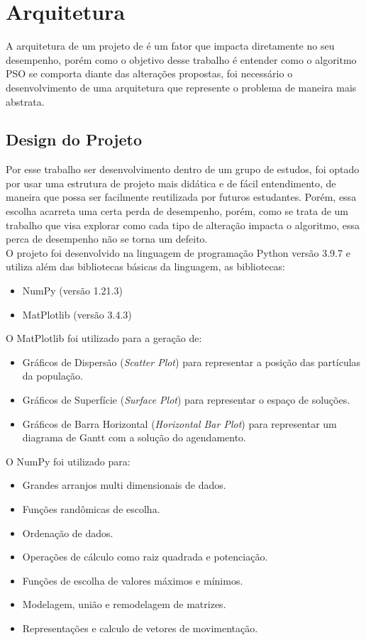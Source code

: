 \section{Arquitetura}
A arquitetura de um projeto de é um fator que impacta diretamente no seu desempenho, porém como o objetivo desse trabalho é entender como o algoritmo PSO se comporta diante das alterações propostas, foi necessário o desenvolvimento de uma arquitetura que represente o problema de maneira mais abstrata.

\subsection{Design do Projeto}
Por esse trabalho ser desenvolvimento dentro de um grupo de estudos, foi optado por usar uma estrutura de projeto mais didática e de fácil entendimento, de maneira que possa ser facilmente reutilizada por futuros estudantes. Porém, essa escolha acarreta uma certa perda de desempenho, porém, como se trata de um trabalho que visa explorar como cada tipo de alteração impacta o algoritmo, essa perca de desempenho não se torna um defeito.\\
\indent O projeto foi desenvolvido na linguagem de programação Python versão 3.9.7 e utiliza além das bibliotecas básicas da linguagem, as bibliotecas:
\begin{itemize}
    \item NumPy (versão 1.21.3)
    \item MatPlotlib (versão 3.4.3)
\end{itemize}

\noindent O MatPlotlib foi utilizado para a geração de: 
\begin{itemize}
    \item Gráficos de Dispersão (\textit{Scatter Plot}) para representar a posição das partículas da população.
    \item Gráficos de Superfície (\textit{Surface Plot}) para representar o espaço de soluções.
    \item Gráficos de Barra Horizontal (\textit{Horizontal Bar Plot}) para representar um diagrama de Gantt com a solução do agendamento.
\end{itemize}

\noindent O NumPy foi utilizado para: 
\begin{itemize}
    \item Grandes arranjos multi dimensionais de dados. 
    \item Funções randômicas de escolha.
    \item Ordenação de dados.
    \item Operações de cálculo como raiz quadrada e potenciação.
    \item Funções de escolha de valores máximos e mínimos.
    \item Modelagem, união e remodelagem de matrizes.
    \item Representações e calculo de vetores de movimentação.
\end{itemize}
        
